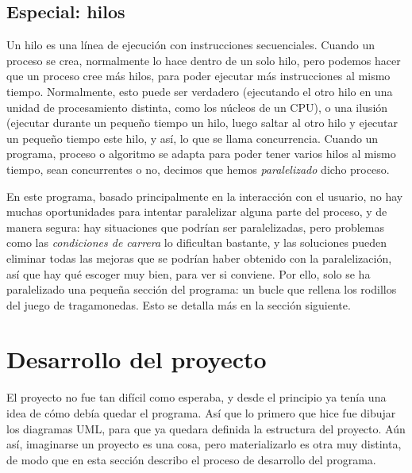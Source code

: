 \documentclass[letterpaper,12pt]{article}
\begin{document}
\subsection{Especial: hilos}
Un hilo es una línea de ejecución con instrucciones secuenciales. Cuando un proceso se crea, normalmente lo hace dentro de un solo hilo, pero podemos hacer que un proceso cree más hilos, para poder ejecutar más instrucciones al mismo tiempo. Normalmente, esto puede ser verdadero (ejecutando el otro hilo en una unidad de procesamiento distinta, como los núcleos de un CPU), o una ilusión (ejecutar durante un pequeño tiempo un hilo, luego saltar al otro hilo y ejecutar un pequeño tiempo este hilo, y así, lo que se llama concurrencia. Cuando un programa, proceso o algoritmo se adapta para poder tener varios hilos al mismo tiempo, sean concurrentes o no, decimos que hemos \emph{paralelizado} dicho proceso.

En este programa, basado principalmente en la interacción con el usuario, no hay muchas oportunidades para intentar paralelizar alguna parte del proceso, y de manera segura: hay situaciones que podrían ser paralelizadas, pero problemas como las \emph{condiciones de carrera} lo dificultan bastante, y las soluciones pueden eliminar todas las mejoras que se podrían haber obtenido con la paralelización, así que hay qué escoger muy bien, para ver si conviene. Por ello, solo se ha paralelizado una pequeña sección del programa: un bucle que rellena los rodillos del juego de tragamonedas. Esto se detalla más en la sección siguiente.

\section{Desarrollo del proyecto}
El proyecto no fue tan difícil como esperaba, y desde el principio ya tenía una idea de cómo debía quedar el programa. Así que lo primero que hice fue dibujar los diagramas UML, para que ya quedara definida la estructura del proyecto. Aún así, imaginarse un proyecto es una cosa, pero materializarlo es otra muy distinta, de modo que en esta sección describo el proceso de desarrollo del programa.
\end{document}
